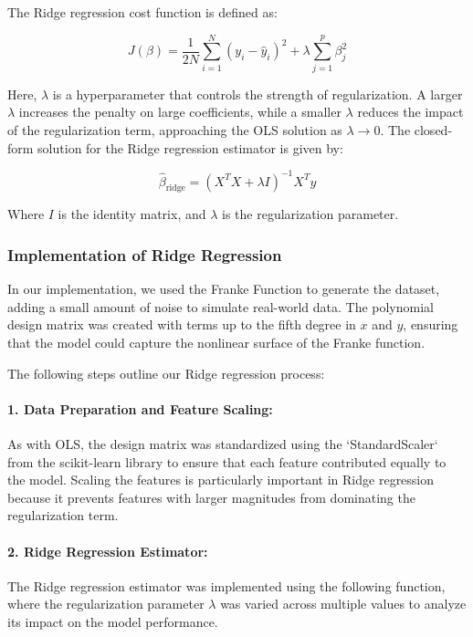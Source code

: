 \documentclass{article}
\begin{document}
The Ridge regression cost function is defined as:

\[
J(\beta) = \frac{1}{2N} \sum_{i=1}^{N} (y_i - \hat{y}_i)^2 + \lambda \sum_{j=1}^{p} \beta_j^2
\]

Here, \( \lambda \) is a hyperparameter that controls the strength of regularization. A larger \( \lambda \) increases the penalty on large coefficients, while a smaller \( \lambda \) reduces the impact of the regularization term, approaching the OLS solution as \( \lambda \to 0 \).
\newline\newline
The closed-form solution for the Ridge regression estimator is given by:

\[
\hat{\beta}_{\text{ridge}} = (X^TX + \lambda I)^{-1} X^T y
\]

Where \(I\) is the identity matrix, and \( \lambda \) is the regularization parameter.

\subsubsection{Implementation of Ridge Regression}

In our implementation, we used the Franke Function to generate the dataset, adding a small amount of noise to simulate real-world data. The polynomial design matrix was created with terms up to the fifth degree in \(x\) and \(y\), ensuring that the model could capture the nonlinear surface of the Franke function.
\newpage

The following steps outline our Ridge regression process:

\paragraph{1. Data Preparation and Feature Scaling:}
As with OLS, the design matrix was standardized using the `StandardScaler` from the scikit-learn library to ensure that each feature contributed equally to the model. Scaling the features is particularly important in Ridge regression because it prevents features with larger magnitudes from dominating the regularization term.

\paragraph{2. Ridge Regression Estimator:}
The Ridge regression estimator was implemented using the following function, where the regularization parameter \( \lambda \) was varied across multiple values to analyze its impact on the model performance.
\end{document}
